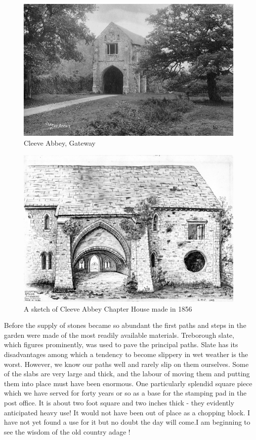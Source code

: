 \begin{figure}
	\centering
     \includegraphics[width=1\textwidth]{figures/CleeveAbbey}
     \caption{Cleeve Abbey, Gateway}
     \label{fig:CleeveAbbey}
\end{figure}

\begin{figure}
	\centering
     \includegraphics[width=1\textwidth]{figures/ChapterHouse}
     \caption{A sketch of Cleeve Abbey Chapter House made in 1856}
     \label{fig:ChapterHouse}
\end{figure}

Before the supply of stones became so abundant the first paths and steps in the garden were made of the most readily available materials. Treborough slate, which figures prominently, was used to pave the principal paths. Slate has its disadvantages among which a tendency to become slippery in wet weather is the worst. However, we know our paths well and rarely slip on them ourselves. Some of the slabs are very large and thick, and the labour of moving them and putting them into place must have been enormous. One particularly splendid square piece which we have served for forty years or so as a base for the stamping pad in the post office. It is about two foot square and two inches thick - they evidently anticipated heavy use! It would not have been out of place as a chopping block. I have not yet found a use for it but no doubt the day will come.I am beginning to see the wisdom of the old country adage !

